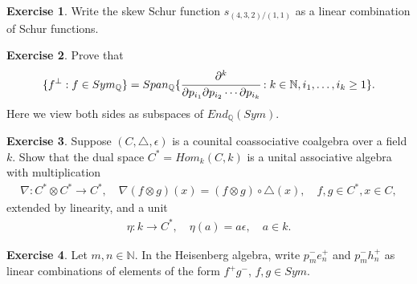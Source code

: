 \documentclass[12pt]{extarticle}
\newcommand{\set}[1]{\{#1\}}
\newcommand{\N}{\mathbb{N}}
\newcommand{\Q}{\mathbb{Q}}
\newcommand{\<}{\langle}
\renewcommand{\>}{\rangle}
\theoremstyle{definition}
\newtheorem{exercise}{Exercise}
\begin{document}
\begin{exercise}
  Write the skew Schur function $s_{(4,3,2)/(1,1)}$ as a linear combination of Schur functions. 
\end{exercise}

\begin{exercise}
  Prove that
  \begin{align*}
    \set{f^{\perp} : f \in Sym_\Q} = Span_{\Q}\set{\cfrac{\partial^k}{\partial p_{i_1} \partial p_{i_2} \cdots \partial p_{i_k}} : k \in \N, i_1, \dots, i_k \geq 1 }.
  \end{align*}
  Here we view both sides as subspaces of $End_{\Q}(Sym)$.
\end{exercise}

\begin{exercise}
  Suppose $(C, \triangle, \epsilon)$ is a counital coassociative coalgebra over a field $k$. Show that the dual space $C^* = Hom_k(C,k)$ is a unital associative algebra with multiplication
  \begin{align*}
    \nabla: C^* \otimes C^* \to C^*, \quad \nabla(f \otimes g)(x) = (f \otimes g) \circ \triangle(x), \quad f,g \in C^*, x \in C,
  \end{align*}
  extended by linearity, and a unit
  \begin{align*}
    \eta: k \to C^* , \quad \eta(a) = a\epsilon, \quad a \in k.
  \end{align*}
\end{exercise}

\begin{exercise}
  Let $m,n \in \N$. In the Heisenberg algebra, write $p_m^-e_n^+$ and $p_m^-h_n^+$ as linear combinations of elements of the form $f^+g^-$, $f,g \in Sym$.
\end{exercise}
\end{document}
